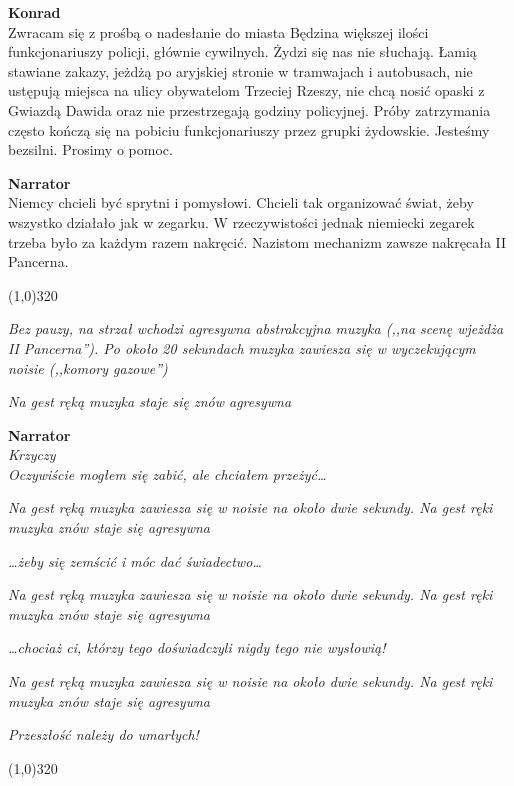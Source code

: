 \documentclass[11pt,a4paper,oneside]{article}
\begin{document}
{\color{konrad}
\textbf{Konrad}\\
Zwracam się z prośbą o nadesłanie do miasta Będzina większej ilości
funkcjonariuszy policji, głównie cywilnych. Żydzi się nas nie
słuchają. Łamią stawiane zakazy, jeżdżą po aryjskiej stronie
w tramwajach i autobusach, nie ustępują miejsca na ulicy obywatelom
Trzeciej Rzeszy, nie chcą nosić opaski z Gwiazdą Dawida oraz nie
przestrzegają godziny policyjnej. Próby zatrzymania często kończą się
na pobiciu funkcjonariuszy przez grupki żydowskie. Jesteśmy bezsilni.
Prosimy o pomoc.
}

\textbf{Narrator}\\
Niemcy chcieli być sprytni i pomysłowi. Chcieli tak organizować świat,
żeby wszystko działało jak w zegarku. W rzeczywistości jednak
niemiecki zegarek trzeba było za każdym razem nakręcić. Nazistom
mechanizm zawsze nakręcała II Pancerna. 

\line(1,0){320}

{\color{light-gray} \emph{Bez pauzy, na strzał wchodzi agresywna
abstrakcyjna muzyka (,,na scenę wjeżdża II Pancerna''). Po około 20
sekundach muzyka zawiesza się w wyczekującym noisie (,,komory
gazowe'')}}

{\color{light-gray} \emph{Na gest ręką muzyka staje się znów
agresywna}}

\textbf{Narrator}\\
{\color{light-gray} \emph{Krzyczy}}\\
\emph{Oczywiście mogłem się zabić, ale chciałem przeżyć\dots{}} 

{\color{light-gray} \emph{Na gest ręką
muzyka zawiesza się w noisie na około dwie sekundy. Na gest ręki
muzyka znów staje się agresywna}}

\emph{\dots{}żeby się zemścić i móc dać świadectwo\dots{}}

{\color{light-gray} \emph{Na gest ręką
muzyka zawiesza się w noisie na około dwie sekundy. Na gest ręki
muzyka znów staje się agresywna}}

\emph{\dots{}chociaż ci, którzy tego doświadczyli nigdy tego nie wysłowią!}

{\color{light-gray} \emph{Na gest ręką
muzyka zawiesza się w noisie na około dwie sekundy. Na gest ręki
muzyka znów staje się agresywna}}

\emph{Przeszłość należy do umarłych!}

\line(1,0){320}
\end{document}
